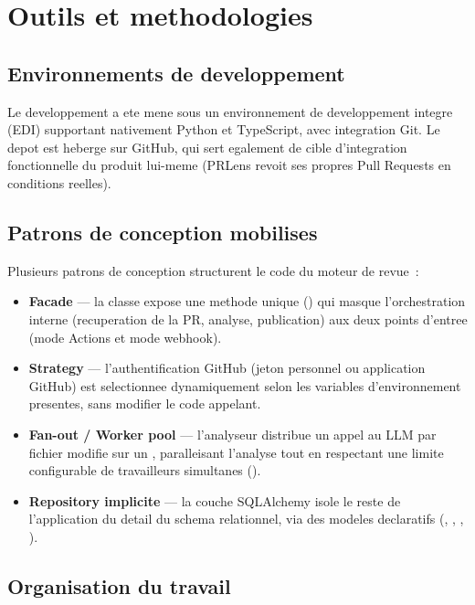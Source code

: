 \documentclass[a4paper,12pt,oneside]{report}
\begin{document}
\section{Outils et methodologies}

\subsection{Environnements de developpement}

Le developpement a ete mene sous un environnement de developpement integre (EDI) supportant nativement Python et TypeScript, avec integration Git. Le depot est heberge sur GitHub, qui sert egalement de cible d'integration fonctionnelle du produit lui-meme (PRLens revoit ses propres Pull Requests en conditions reelles).

\subsection{Patrons de conception mobilises}

Plusieurs patrons de conception structurent le code du moteur de revue~:

\begin{itemize}
  \item \textbf{Facade} --- la classe  expose une methode unique () qui masque l'orchestration interne (recuperation de la PR, analyse, publication) aux deux points d'entree (mode Actions et mode webhook).
  \item \textbf{Strategy} --- l'authentification GitHub (jeton personnel ou application GitHub) est selectionnee dynamiquement selon les variables d'environnement presentes, sans modifier le code appelant.
  \item \textbf{Fan-out / Worker pool} --- l'analyseur distribue un appel au LLM par fichier modifie sur un , paralleisant l'analyse tout en respectant une limite configurable de travailleurs simultanes ().
  \item \textbf{Repository implicite} --- la couche SQLAlchemy isole le reste de l'application du detail du schema relationnel, via des modeles declaratifs (, , , ).
\end{itemize}

\subsection{Organisation du travail}
\end{document}
